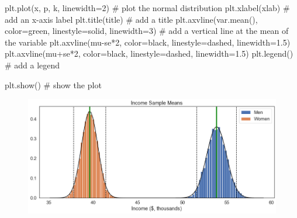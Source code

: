 \documentclass[
  letterpaper,
  DIV=11,
  numbers=noendperiod]{scrreprt}
\newenvironment{Shaded}{\begin{snugshade}}{\end{snugshade}}
\newcommand{\CommentTok}[1]{\textcolor[rgb]{0.37,0.37,0.37}{#1}}
\newcommand{\DecValTok}[1]{\textcolor[rgb]{0.68,0.00,0.00}{#1}}
\newcommand{\FloatTok}[1]{\textcolor[rgb]{0.68,0.00,0.00}{#1}}
\newcommand{\NormalTok}[1]{\textcolor[rgb]{0.00,0.23,0.31}{#1}}
\newcommand{\OperatorTok}[1]{\textcolor[rgb]{0.37,0.37,0.37}{#1}}
\newcommand{\StringTok}[1]{\textcolor[rgb]{0.13,0.47,0.30}{#1}}
\begin{document}
\begin{Shaded}
\begin{Highlighting}[]
\NormalTok{            plt.plot(x, p, }\StringTok{\textquotesingle{}k\textquotesingle{}}\NormalTok{, linewidth}\OperatorTok{=}\DecValTok{2}\NormalTok{) }\CommentTok{\# plot the normal distribution}
\NormalTok{            plt.xlabel(xlab) }\CommentTok{\# add an x{-}axis label}
\NormalTok{            plt.title(title) }\CommentTok{\# add a title}
\NormalTok{            plt.axvline(var.mean(), color}\OperatorTok{=}\StringTok{\textquotesingle{}green\textquotesingle{}}\NormalTok{, linestyle}\OperatorTok{=}\StringTok{\textquotesingle{}solid\textquotesingle{}}\NormalTok{, linewidth}\OperatorTok{=}\DecValTok{3}\NormalTok{) }\CommentTok{\# add a vertical line at the mean of the variable}
\NormalTok{            plt.axvline(mu}\OperatorTok{{-}}\NormalTok{se}\OperatorTok{*}\DecValTok{2}\NormalTok{, color}\OperatorTok{=}\StringTok{\textquotesingle{}black\textquotesingle{}}\NormalTok{, linestyle}\OperatorTok{=}\StringTok{\textquotesingle{}dashed\textquotesingle{}}\NormalTok{, linewidth}\OperatorTok{=}\FloatTok{1.5}\NormalTok{)}
\NormalTok{            plt.axvline(mu}\OperatorTok{+}\NormalTok{se}\OperatorTok{*}\DecValTok{2}\NormalTok{, color}\OperatorTok{=}\StringTok{\textquotesingle{}black\textquotesingle{}}\NormalTok{, linestyle}\OperatorTok{=}\StringTok{\textquotesingle{}dashed\textquotesingle{}}\NormalTok{, linewidth}\OperatorTok{=}\FloatTok{1.5}\NormalTok{)}
\NormalTok{            plt.legend() }\CommentTok{\# add a legend}
            
\NormalTok{        plt.show()  }\CommentTok{\# show the plot }
\end{Highlighting}
\end{Shaded}

\begin{Shaded}
\end{Shaded}

\begin{figure}[H]

{\centering \includegraphics{notebooks/W05. Distributions and Basic Statistics_files/figure-pdf/cell-29-output-1.png}

}

\end{figure}
\end{document}
